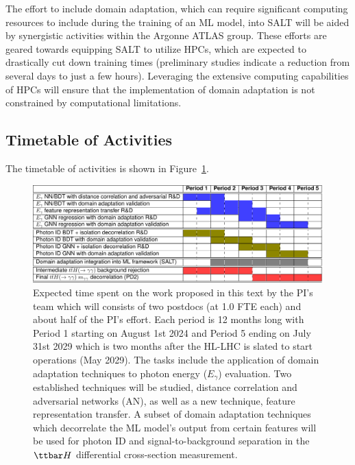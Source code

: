 \documentclass[letter, USenglish, 11pt, subfigure]{article}
\begin{document}
The effort to include domain adaptation, which can require significant computing resources to include during the training of an ML model, into SALT will be aided by synergistic activities within the Argonne ATLAS group. These efforts are geared towards equipping SALT to utilize HPCs, which are expected to drastically cut down training times (preliminary studies indicate a reduction from several days to just a few hours). Leveraging the extensive computing capabilities of HPCs will ensure that the implementation of domain adaptation is not constrained by computational limitations.

\subsection{Timetable of Activities}
\label{sec:timetable}

The timetable of activities is shown in Figure~\ref{fig:timetable}.
\begin{figure}[!htbp]
  \centering
  \includegraphics[width=\textwidth]{figures/timeline.pdf}
  \caption{Expected time spent on the work proposed in this text by the PI's team which will consists of two postdocs (at 1.0 FTE each) and about half of the PI's effort. Each period is 12 months long with Period 1 starting on August 1st 2024 and Period 5 ending on July 31st 2029 which is two months after the HL-LHC is slated to start operations (May 2029). The tasks include the application of domain adaptation  techniques to photon energy ($E_{\gamma}$) evaluation. Two established techniques will be studied, distance correlation and adversarial networks (AN), as well as a new technique, feature representation transfer. A subset of domain adaptation techniques which decorrelate the ML model's output from certain features will be used for photon ID and signal-to-background separation in the $\ttbar H$ differential cross-section measurement.
  }
  \label{fig:timetable}
\end{figure}
\end{document}
